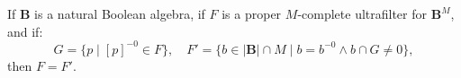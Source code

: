 If $\mathbf{B}$ is a natural Boolean algebra, if $F$ is a proper $M$-complete ultrafilter for $\mathbf{B}^M$, and if:
$$G = \{p \mid [p]^{-0} \in F\}, \quad F' = \{b \in |\mathbf{B}| \cap M \mid b = b^{-0} \land b \cap G \neq 0\},$$
then $F = F'$.
